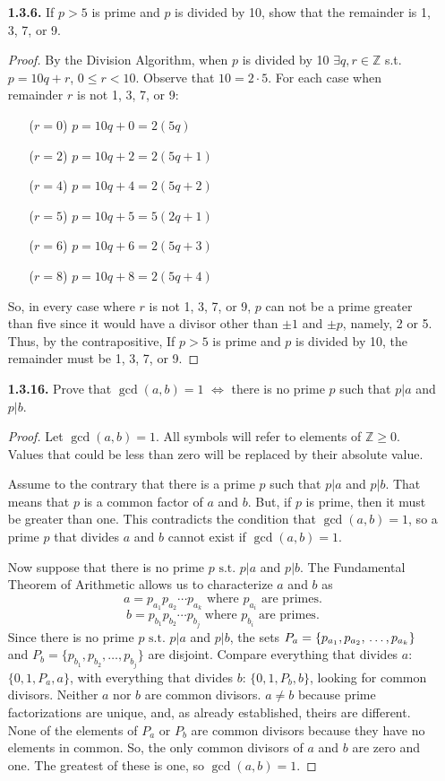 \documentclass[12pt]{article}
\newcommand{\zee}{\mathbb{Z}}
\newcommand{\such}{\text{ s.t. }}
\begin{document}
\begin{itemize}
\item[\textbf{1.3.6.}] If $p>5$ is prime and $p$ is divided by 10, show that the remainder is 1, 3, 7, or 9.

\begin{proof}
By the Division Algorithm, when $p$ is divided by 10 $\exists q, r \in \zee$ s.t. $p = 10 q + r$, $0 \leq r < 10$.
Observe that $10 = 2 \cdot 5$.
For each case when remainder $r$ is not 1, 3, 7, or 9:
\begin{itemize}
\item[($r = 0$)] $p=10q+0 = 2 (5 q)$
\item[($r = 2$)] $p=10q+2 = 2 (5 q + 1)$
\item[($r = 4$)] $p=10q+4 = 2 (5 q + 2)$
\item[($r = 5$)] $p=10q+5 = 5 (2 q + 1)$
\item[($r = 6$)] $p=10q+6 = 2 (5 q + 3)$
\item[($r = 8$)] $p=10q+8 = 2 (5 q + 4)$
\end{itemize}
So, in every case where $r$ is not 1, 3, 7, or 9, $p$ can not be a prime greater than five since it would have a divisor other than ${\pm}1$ and ${\pm}p$, namely, 2 or 5.
Thus, by the contrapositive, If $p>5$ is prime and $p$ is divided by 10, the remainder must be 1, 3, 7, or 9.
\end{proof}



\item[\textbf{1.3.16.}] Prove that $\gcd(a,b)=1$ $\iff$ there is no prime $p$ such that $p|a$ and $p|b$.

\begin{proof}
Let $\gcd(a,b)=1$. All symbols will refer to elements of $\zee \ge 0$. Values that could be less than zero will be replaced by their absolute value.
\par
Assume to the contrary that there is a prime $p$ such that $p|a$ and $p|b$.
That means that $p$ is a common factor of $a$ and $b$.
But, if $p$ is prime, then it must be greater than one.
This contradicts the condition that $\gcd(a,b)=1$, so a prime $p$ that divides $a$ and $b$ cannot exist if $\gcd(a,b)=1$.
\par
Now suppose that there is no prime $p \such p|a$ and $p|b$.
The Fundamental Theorem of Arithmetic allows us to characterize $a$ and $b$ as
\[a=p_{a_1} p_{a_2} \cdots p_{a_k} \text{ where } p_{a_i} \text{ are primes.}\]
\[b=p_{b_1} p_{b_2} \cdots p_{b_j} \text{ where } p_{b_i} \text{ are primes.}\]
Since there is no prime $p \such p|a$ and $p|b$, the sets $P_a = \{p_{a_1}, p_{a_2},\\ \dots, p_{a_k}\}$ and $P_b = \{p_{b_1}, p_{b_2}, \dots, p_{b_j}\}$ are disjoint.
Compare everything that divides $a$: $\{0, 1, P_a, a\}$, with everything that divides $b$: $\{0, 1, P_b, b\}$, looking for common divisors.
Neither $a$ nor $b$ are common divisors.
$a \neq b$ because prime factorizations are unique, and, as already established, theirs are different.
None of the elements of $P_a$ or $P_b$ are common divisors because they have no elements in common.
So, the only common divisors of $a$ and $b$ are zero and one.
The greatest of these is one, so $\gcd(a,b)=1$.
\end{proof}


\end{itemize}
\end{document}
